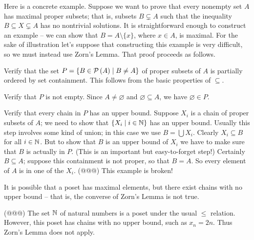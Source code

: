 Here is a concrete example.
Suppose we want to prove that every nonempty set \(A\) has maximal proper subsets; that is, subsets \(B \subsetneq A\) such that the inequality \(B \subseteq X \subsetneq A\) has no nontrivial solutions.
It is straightforward enough to construct an example -- we can show that \(B = A \setminus \{x\}\), where \(x \in A\), is maximal.
For the sake of illustration let's suppose that constructing this example is very difficult, so we must instead use Zorn's Lemma.
That proof proceeds as follows.
\begin{proplist}
\item Verify that the set \(P = \{ B \in \mathcal{P}\left(A\right) \mid B \neq A \}\) of proper subsets of \(A\) is partially ordered by set containment.
This follows from the basic properties of \(\subseteq\).
\item Verify that \(P\) is not empty.
Since \(A \neq \varnothing\) and \(\varnothing \subseteq A\), we have \(\varnothing \in P\).
\item Verify that every chain in \(P\) has an upper bound.
Suppose \(X_i\) is a chain of proper subsets of \(A\); we need to show that \(\{ X_i \mid i \in \mathbb{N} \}\) has an upper bound.
Usually this step involves some kind of union; in this case we use \(B = \bigcup X_i\).
Clearly \(X_i \subseteq B\) for all \(i \in \mathbb{N}\).
But to show that \(B\) is an upper bound of \(X_i\) we have to make sure that \(B\) is actually in \(P\).
(This is an important but easy-to-forget step!)
Certainly \(B \subseteq A\); suppose this containment is not proper, so that \(B = A\).
So every element of \(A\) is in one of the \(X_i\).
(@@@) This example is broken!
\end{proplist}

It is possible that a poset has maximal elements, but there exist chains with no upper bound -- that is, the converse of Zorn's Lemma is not true.



\Exercises%

\begin{exercise}
(@@@) The set \(\mathbb{N}\) of natural numbers is a poset under the usual \(\leq\) relation.
However, this poset has chains with no upper bound, such as \(x_n = 2n\).
Thus Zorn's Lemma does not apply.
\end{exercise}
